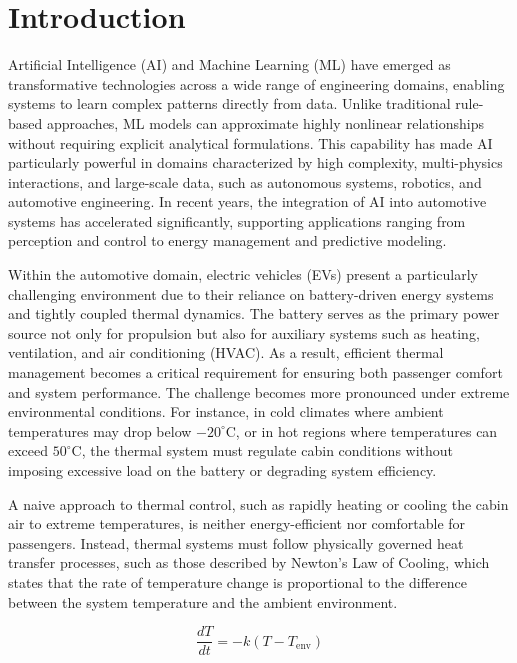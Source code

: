 
\chapter{Introduction}

Artificial Intelligence (AI) and Machine Learning (ML) have emerged as transformative technologies across a wide range of engineering domains, enabling systems to learn complex patterns directly from data. Unlike traditional rule-based approaches, ML models can approximate highly nonlinear relationships without requiring explicit analytical formulations. This capability has made AI particularly powerful in domains characterized by high complexity, multi-physics interactions, and large-scale data, such as autonomous systems, robotics, and automotive engineering. In recent years, the integration of AI into automotive systems has accelerated significantly, supporting applications ranging from perception and control to energy management and predictive modeling.

Within the automotive domain, electric vehicles (EVs) present a particularly challenging environment due to their reliance on battery-driven energy systems and tightly coupled thermal dynamics. The battery serves as the primary power source not only for propulsion but also for auxiliary systems such as heating, ventilation, and air conditioning (HVAC). As a result, efficient thermal management becomes a critical requirement for ensuring both passenger comfort and system performance. The challenge becomes more pronounced under extreme environmental conditions. For instance, in cold climates where ambient temperatures may drop below $-20^\circ$C, or in hot regions where temperatures can exceed $50^\circ$C, the thermal system must regulate cabin conditions without imposing excessive load on the battery or degrading system efficiency.

A naive approach to thermal control, such as rapidly heating or cooling the cabin air to extreme temperatures, is neither energy-efficient nor comfortable for passengers. Instead, thermal systems must follow physically governed heat transfer processes, such as those described by Newton’s Law of Cooling, which states that the rate of temperature change is proportional to the difference between the system temperature and the ambient environment.

\begin{equation}
\frac{dT}{dt} = -k (T - T_{\text{env}})
\end{equation}


